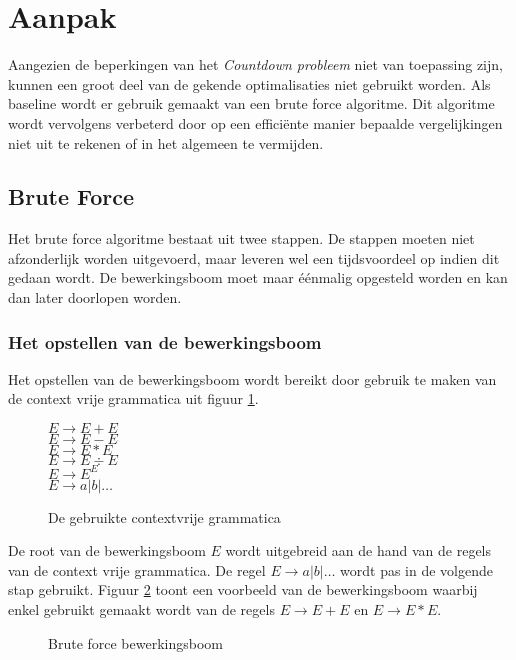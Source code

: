 \documentclass[Main.tex]{subfiles}
\begin{document}
\section{Aanpak}
Aangezien de beperkingen van het \textit{Countdown probleem} niet van toepassing zijn, kunnen een groot deel van de gekende optimalisaties niet gebruikt worden. Als baseline wordt er gebruik gemaakt van een brute force algoritme. Dit algoritme wordt vervolgens verbeterd door op een effici\"ente manier bepaalde vergelijkingen niet uit te rekenen of in het algemeen te vermijden.
\subsection{Brute Force}
Het brute force algoritme bestaat uit twee stappen. De stappen moeten niet afzonderlijk worden uitgevoerd, maar leveren wel een tijdsvoordeel op indien dit gedaan wordt. De bewerkingsboom moet maar \'e\'enmalig opgesteld worden en kan dan later doorlopen worden.

\subsubsection*{Het opstellen van de bewerkingsboom}
Het opstellen van de bewerkingsboom wordt bereikt door gebruik te maken van de context vrije grammatica uit figuur \ref{fig:cfgVol}. 
\begin{figure}[!htb]
\centering
\begin{framed}
$E \rightarrow E + E$ \\
$E \rightarrow E - E$ \\
$E \rightarrow E \ast E$ \\
$E \rightarrow E \div E$ \\
$E \rightarrow E^{E}$ \\
$E \rightarrow a | b | \dotsc$
\end{framed}
\caption{De gebruikte contextvrije grammatica}
\label{fig:cfgVol}
\end{figure}
De root van de bewerkingsboom $E$ wordt uitgebreid aan de hand van de regels van de context vrije grammatica. De regel $E \rightarrow a | b | \dotsc$ wordt pas in de volgende stap gebruikt. Figuur \ref{fig:bewerkingsboom} toont een voorbeeld van de bewerkingsboom waarbij enkel gebruikt gemaakt wordt van de regels $E \rightarrow E+E$ en $E \rightarrow E \ast E$.



\begin{figure}[!htb]
\centering
{}
\caption{Brute force bewerkingsboom} \label{fig:bewerkingsboom}
\end{figure}
\end{document}
